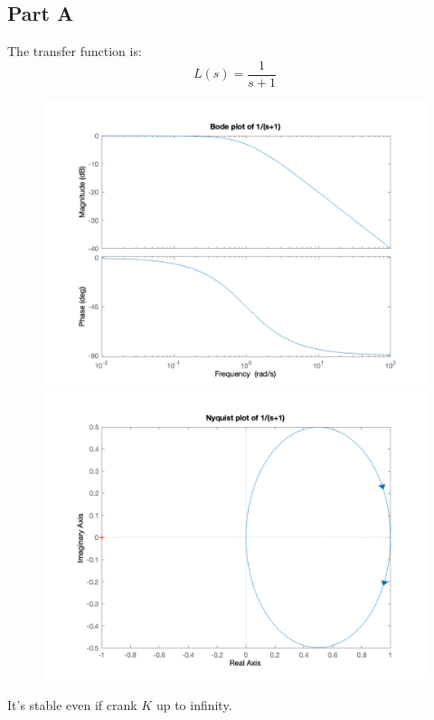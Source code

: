 \documentclass[a4paper]{article}
\begin{document}
\subsection{Part A} 
The transfer function is:
$$
L(s) = \frac{1}{s+1}
$$
\begin{figure}[H]
\centering
\begin{minipage}[t]{0.48\textwidth}
\centering
\includegraphics[width=\textwidth]{pic/1.png}
\end{minipage}
\begin{minipage}[t]{0.48\textwidth}
\centering
\includegraphics[width=\textwidth]{pic/2.png}
\end{minipage}
\end{figure}
It's stable even if crank $K$ up to infinity.
\end{document}
